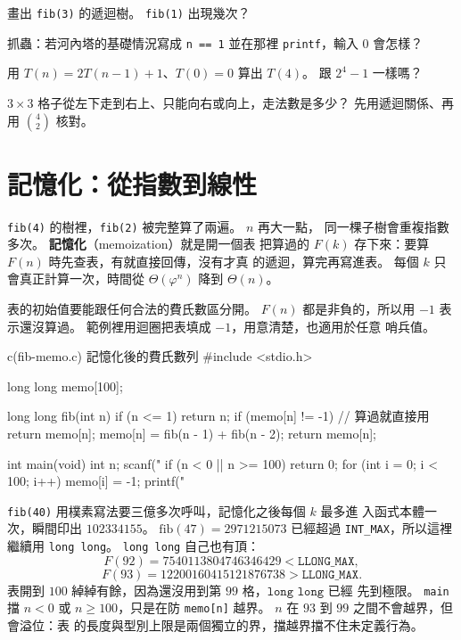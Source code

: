 
\begin{drills}[label=drills:rec-fib-hanoi]
\item 畫出 \texttt{fib(3)} 的遞迴樹。 \texttt{fib(1)} 出現幾次？
\item 抓蟲：若河內塔的基礎情況寫成 \texttt{n == 1} 並在那裡
\texttt{printf}，輸入 $0$ 會怎樣？
\item 用 $T(n) = 2T(n-1)+1$、$T(0)=0$ 算出 $T(4)$。 跟 $2^4-1$ 一樣嗎？
\item $3 \times 3$ 格子從左下走到右上、只能向右或向上，走法數是多少？
先用遞迴關係、再用 $\binom{4}{2}$ 核對。
\end{drills}

\section{記憶化：從指數到線性}
\label{sec:rec-memo}

\texttt{fib(4)} 的樹裡，\texttt{fib(2)} 被完整算了兩遍。 $n$ 再大一點，
同一棵子樹會重複指數多次。 \textbf{記憶化}（memoization）就是開一個表
把算過的 $F(k)$ 存下來：要算 $F(n)$ 時先查表，有就直接回傳，沒有才真
的遞迴，算完再寫進表。 每個 $k$ 只會真正計算一次，時間從
$\Theta(\varphi^n)$ 降到 $\Theta(n)$。

表的初始值要能跟任何合法的費氏數區分開。 $F(n)$ 都是非負的，所以用
$-1$ 表示還沒算過。 範例裡用迴圈把表填成 $-1$，用意清楚，也適用於任意
哨兵值。

\begin{example}{c}{(fib-memo.c) 記憶化後的費氏數列}
#include <stdio.h>

long long memo[100];

long long fib(int n) {
    if (n <= 1) {
        return n;
    }
    if (memo[n] != -1) {       // 算過就直接用
        return memo[n];
    }
    memo[n] = fib(n - 1) + fib(n - 2);
    return memo[n];
}

int main(void) {
    int n;
    scanf("%
    if (n < 0 || n >= 100) {
        return 0;
    }
    for (int i = 0; i < 100; i++) {
        memo[i] = -1;
    }
    printf("%
}
\end{example}


\texttt{fib(40)} 用樸素寫法要三億多次呼叫，記憶化之後每個 $k$ 最多進
入函式本體一次，瞬間印出 $102334155$。 $\mathrm{fib}(47) = 2971215073$
已經超過 \texttt{INT\_MAX}，所以這裡繼續用 \texttt{long long}。
\texttt{long long} 自己也有頂：
\[
F(92) = 7540113804746346429 < \texttt{LLONG\_MAX},
\]
\[
F(93) = 12200160415121876738 > \texttt{LLONG\_MAX}.
\]
表開到 $100$ 綽綽有餘，因為還沒用到第 $99$ 格，$\texttt{long long}$ 已經
先到極限。 \texttt{main} 擋 $n < 0$ 或 $n \ge 100$，只是在防
\texttt{memo[n]} 越界。 $n$ 在 $93$ 到 $99$ 之間不會越界，但會溢位：表
的長度與型別上限是兩個獨立的界，擋越界擋不住未定義行為。

